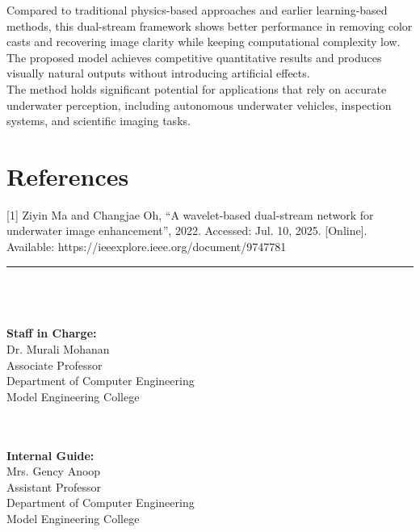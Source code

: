 \documentclass[a4paper,12pt]{article}
\begin{document}
Compared to traditional physics-based approaches and earlier learning-based methods, this dual-stream framework shows better performance in removing color casts and recovering image clarity while keeping computational complexity low. The proposed model achieves competitive quantitative results and produces visually natural outputs without introducing artificial effects.\\

The method holds significant potential for applications that rely on accurate underwater perception, including autonomous underwater vehicles, inspection systems, and scientific imaging tasks.


\section*{References}
[1] Ziyin Ma and Changjae Oh, “A wavelet-based dual-stream network for underwater image enhancement”, 2022. Accessed: Jul. 10, 2025. [Online].\\
Available: https://ieeexplore.ieee.org/document/9747781

 \vspace{0.5cm}
 \hrule 
 \vspace{0.5cm}
 
\noindent
\\
\\
\\
\textbf{Staff in Charge:}\\
Dr. Murali Mohanan\\
Associate Professor\\
Department of Computer Engineering\\
Model Engineering College

\vspace{0.5cm}

\noindent
\\
\\
\textbf{Internal Guide:}\\
Mrs. Gency Anoop\\
Assistant Professor\\
Department of Computer Engineering\\
Model Engineering College
\end{document}
